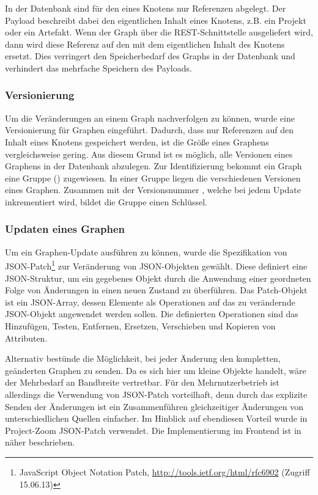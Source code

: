 In der Datenbank sind für den  eines Knotens nur Referenzen abgelegt. Der Payload beschreibt dabei den eigentlichen Inhalt eines Knotens, z.B. ein Projekt oder ein Artefakt. Wenn der Graph über die REST-Schnittstelle ausgeliefert wird, dann wird diese Referenz auf den  mit dem eigentlichen Inhalt des Knotens ersetzt. Dies verringert den Speicherbedarf des Graphs in der Datenbank und verhindert das mehrfache Speichern des Payloads.

\subsubsection{Versionierung}

Um die Veränderungen an einem Graph nachverfolgen zu können, wurde eine Versionierung für Graphen eingeführt. Dadurch, dass nur Referenzen auf den Inhalt eines Knotens gespeichert werden, ist die Größe eines Graphens vergleichsweise gering. Aus diesem Grund ist es möglich, alle Versionen eines Graphens in der Datenbank abzulegen. Zur Identifizierung bekommt ein Graph eine Gruppe () zugewiesen. In einer Gruppe liegen die verschiedenen Versionen eines Graphen. Zusammen mit der Versionsnummer , welche bei jedem Update inkrementiert wird, bildet die Gruppe einen Schlüssel.

\subsubsection{Updaten eines Graphen}

Um ein Graphen-Update ausführen zu können, wurde die Spezifikation von JSON-Patch\footnote{JavaScript Object Notation Patch, \url{http://tools.ietf.org/html/rfc6902} (Zugriff 15.06.13)} zur Veränderung von JSON-Objekten gewählt. Diese definiert eine JSON-Struktur, um ein gegebenes Objekt durch die Anwendung einer geordneten Folge von Änderungen in einen neuen Zustand zu überführen. Das Patch-Objekt ist ein JSON-Array, dessen Elemente als Operationen auf das zu verändernde JSON-Objekt angewendet werden sollen. Die definierten Operationen sind das Hinzufügen, Testen, Entfernen, Ersetzen, Verschieben und Kopieren von Attributen.

Alternativ bestünde die Möglichkeit, bei jeder Änderung den kompletten, geänderten Graphen zu senden. Da es sich hier um kleine Objekte handelt, wäre der Mehrbedarf an Bandbreite vertretbar. Für den Mehrnutzerbetrieb ist allerdings die Verwendung von JSON-Patch vorteilhaft, denn durch das explizite Senden der Änderungen ist ein Zusammenführen gleichzeitiger Änderungen von unterschiedlichen Quellen einfacher. Im Hinblick auf ebendiesen Vorteil wurde in Project-Zoom JSON-Patch verwendet. Die Implementierung im Frontend ist in \cite{bp-norman} näher beschrieben.

